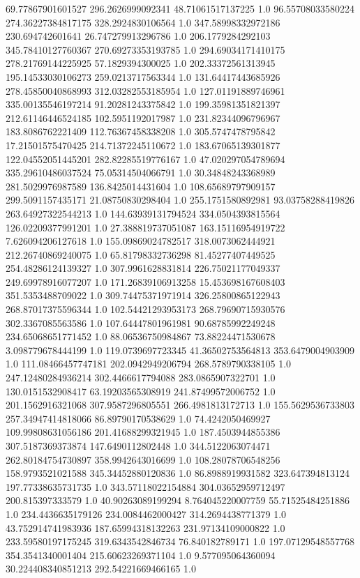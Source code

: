 69.77867901601527	296.2626999092341	48.71061517137225	1.0
96.55708033580224	274.36227384817175	328.2924830106564	1.0
347.58998332972186	230.694742601641	26.747279913296786	1.0
206.1779284292103	345.78410127760367	270.69273353193785	1.0
294.69034171410175	278.21769144225925	57.1829394300025	1.0
202.33372561313945	195.14533030106273	259.0213717563344	1.0
131.64417443685926	278.45850040868993	312.03282553185954	1.0
127.01191889746961	335.00135546197214	91.20281243375842	1.0
199.35981351821397	212.61146446524185	102.5951192017987	1.0
231.82344096796967	183.8086762221409	112.76367458338208	1.0
305.5747478795842	17.21501575470425	214.71372245110672	1.0
183.67065139301877	122.04552051445201	282.82285519776167	1.0
47.020297054789694	335.29610486037524	75.05314504066791	1.0
30.34848243368989	281.5029976987589	136.8425014431604	1.0
108.65689797909157	299.5091157435171	21.08750830298404	1.0
255.1751580892981	93.03758288419826	263.64927322544213	1.0
144.63939131794524	334.0504393815564	126.02209377991201	1.0
27.388819737051087	163.15116954919722	7.626094206127618	1.0
155.09869024782517	318.0073062444921	212.26740869240075	1.0
65.81798332736298	81.45277407449525	254.48286124139327	1.0
307.9961628831814	226.75021177049337	249.69978916077207	1.0
171.26839106913258	15.453698167608403	351.5353488709022	1.0
309.74475371971914	326.25800865122943	268.87017375596344	1.0
102.54421293953173	268.79690715930576	302.3367085563586	1.0
107.64447801961981	90.68785992249248	234.65068651771452	1.0
88.06536750984867	73.88224471530678	3.098779678444199	1.0
119.0739697723345	41.36502753564813	353.6479004903909	1.0
111.08466457747181	202.0942949206794	268.5789790338105	1.0
247.12480284936214	302.4466617794088	283.0865907322701	1.0
130.0151532908417	63.19203565308919	241.87499572006752	1.0
201.1562916321068	307.9587296805551	266.4981813172713	1.0
155.5629536733803	257.34947414818066	86.89790170538629	1.0
74.4242050469927	109.99808631056186	201.41688299321945	1.0
187.4503944855386	307.5187369373874	147.6490112802448	1.0
344.5122063074471	262.80184754730897	358.9942643016699	1.0
108.28078706548256	158.9793521021588	345.34452880120836	1.0
86.8988919931582	323.647394813124	197.77338635731735	1.0
343.57118022154884	304.03652959712497	200.815397333579	1.0
40.90263089199294	8.764045220007759	55.71525484251886	1.0
234.4436635179126	234.0084462000427	314.2694438771379	1.0
43.752914741983936	187.65994318132263	231.97134109000822	1.0
233.59580197175245	319.6343542846734	76.840182789171	1.0
197.07129548557768	354.3541340001404	215.60623269371104	1.0
9.577095064360094	30.224408340851213	292.54221669466165	1.0
